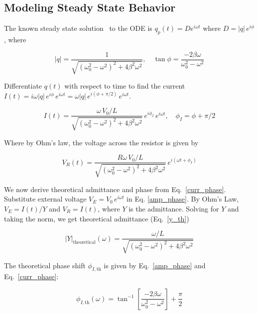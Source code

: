 \documentclass[11pt]{article}
\begin{document}
\subsection{Modeling Steady State Behavior}


The known steady state solution~\cite{gingrich} to the ODE is $q_p(t)=De^{i\omega t}$ where $D=|q|\,e^{i\phi}$, where


\begin{equation}
  \label{amp_phase}
|q| = \frac{1}{\sqrt{(\omega_0^2-\omega^2)^2+4\beta^2\omega^2}}, \quad \tan\phi = \frac{-2\beta\omega}{\omega_0^2 - \omega^2}
\end{equation}


Differentiate $q(t)$ with respect to time to find the current $I(t)=i\omega\left\lvert{q}\right\rvert\,e^{i\phi}\,e^{i\omega t}=\omega\left\lvert{q}\right\rvert\,e^{i(\phi+\pi/2)}\,e^{i\omega t}$.




\begin{equation}
  \label{curr_phase}
I(t)=\frac{\omega\,V_{0}  / L}{\sqrt{(\omega_{0}^{2}-\omega ^{2})^{2}+4\beta^{2}\omega ^{2}}}\,e^{i\phi_{I}}\,e^{i\omega t}, \quad \phi_I=\phi + \pi / 2
\end{equation}

Where by Ohm's law, the voltage across the resistor is given by 

\begin{equation}
  \label{volt_r_phasor}
  V_R(t)=\frac{R\omega\,V_{0}  / L}{\sqrt{(\omega_{0}^{2}-\omega ^{2})^{2}+4\beta^{2}\omega ^{2}}}\,e^{i(\omega t + \phi_I)}
\end{equation}

We now derive theoretical admittance and phase from Eq.~\eqref{curr_phase}. Substitute external voltage $V_{E}=V_{0}\,e^{i\omega t}$ in Eq. \eqref{amp_phase}. By Ohm's Law, $V_{E}=I(t) /Y$ and $V_{R}=I(t)$, where $Y$ is the admittance. Solving for $Y$ and taking the norm, we get theoretical admittance (Eq.~\eqref{y_th})

\begin{equation}
  \label{y_th}
    |Y|_{\text{theoretical}}(\omega)=\frac{\omega  / L}{\sqrt{(\omega_{0}^{2}-\omega ^{2})^{2}+4\beta^{2}\omega ^{2}}}
\end{equation}

The theoretical phase shift $\phi_{I,\text{th}}$ is given by Eq.~\eqref{amp_phase} and Eq.~\eqref{curr_phase}:

\begin{equation}
  \label{phi_th}
  \phi_{I,\text{th}}(\omega) = \tan^{-1} \left[{\frac{-2\beta\omega}{\omega_0^2 - \omega^2}}\right] + \frac{\pi}{2}
\end{equation}
\end{document}
